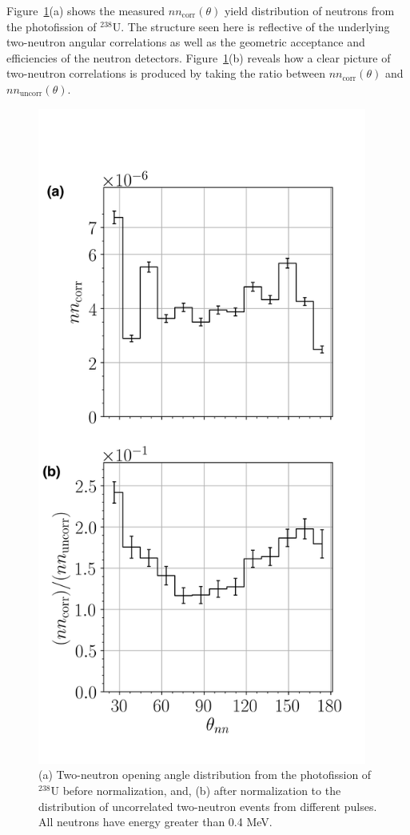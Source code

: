 Figure~\ref{fig:SPDPNormalization}(a) shows the measured $nn_{\text{corr}}(\theta)$ yield distribution of neutrons from the photofission of $^{238}$U.
The structure seen here is reflective of the underlying two-neutron angular correlations as well as the geometric acceptance and efficiencies of the neutron detectors.
Figure~\ref{fig:SPDPNormalization}(b) reveals how a clear picture of two-neutron correlations is produced by taking the ratio between $nn_{\text{corr}}(\theta)$ and $nn_{\text{uncorr}}(\theta)$.
\begin{figure}[]
\centering
    \includegraphics[width=0.965\textwidth]{Content/Methods/SPDPNormalization.png}
    \caption{(a) Two-neutron opening angle distribution from the photofission of $^{238}$U before normalization, and, (b) after normalization to the distribution of uncorrelated two-neutron events from different pulses. All neutrons have energy greater than 0.4 MeV.}
    \label{fig:SPDPNormalization}
\end{figure}

